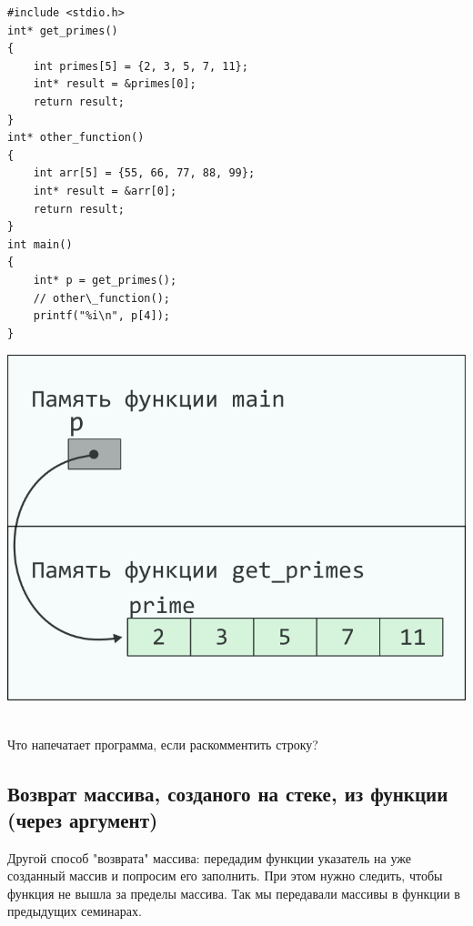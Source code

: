 \documentclass[10pt]{article}
\begin{document}
\noindent\begin{minipage}{.45\textwidth}
\begin{lstlisting}
#include <stdio.h>
int* get_primes() 
{
    int primes[5] = {2, 3, 5, 7, 11};
    int* result = &primes[0];
    return result;
}
int* other_function() 
{
    int arr[5] = {55, 66, 77, 88, 99};
    int* result = &arr[0];
    return result;
}
int main() 
{
    int* p = get_primes();
    // other\_function();
    printf("%i\n", p[4]);
}
\end{lstlisting}
\end{minipage}
\begin{minipage}{.45\textwidth}
\includegraphics[scale=0.9]{../images/pointer_schemes/function_return_stack_array.png}
\end{minipage}\\
Что напечатает программа, если раскомментить строку?

\subsection*{Возврат массива, созданого на стеке, из функции (через аргумент)}

Другой способ "возврата"{} массива: передадим функции указатель на
уже созданный массив и попросим его заполнить.
При этом нужно следить, чтобы функция не вышла за пределы массива.
Так мы передавали массивы в функции в предыдущих семинарах.
\end{document}
